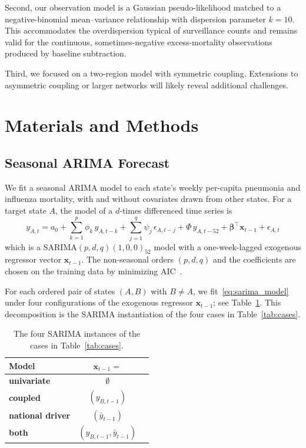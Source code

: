 \documentclass[11pt]{article}
\begin{document}
Second, our observation model is a Gaussian pseudo-likelihood matched
to a negative-binomial mean--variance relationship with dispersion
parameter $k = 10$. This accommodates the overdispersion typical of
surveillance counts and remains valid for the continuous,
sometimes-negative excess-mortality observations produced by baseline
subtraction.

Third, we focused on a two-region model with symmetric coupling.
Extensions to asymmetric coupling or larger networks will likely
reveal additional challenges.

\section{Materials and Methods}

\subsection{Seasonal ARIMA Forecast}\label{subsec:sarimabench}
We fit a seasonal ARIMA model to each state's weekly per-capita
pneumonia and influenza mortality, with and without covariates drawn
from other states. For a target state $A$, the model of a $d$-times
differenced time series is
\begin{equation}\label{eq:sarima_model}
  y_{A,t}  = a_0
    + \sum_{k=1}^{p} \phi_k\, y_{A, t-k}
    + \sum_{j=1}^{q} \psi_j\, \epsilon_{A, t-j}
    + \Phi\, y_{A, t-52}
    + \boldsymbol{\beta}^{\top} \mathbf{x}_{t-1}
    + \epsilon_{A,t}%
\end{equation}
which is a SARIMA$(p,d,q)(1,0,0)_{52}$ model with a one-week-lagged
exogenous regressor vector $\mathbf{x}_{t-1}$.
The non-seasonal orders $(p, d, q)$ and the coefficients are chosen on
the training data by minimizing AIC~\citep{hyndman2008}.

For each ordered pair of states $(A, B)$ with $B \neq A$, we
fit~\eqref{eq:sarima_model} under four configurations of the exogenous
regressor $\mathbf{x}_{t-1}$; see Table~\ref{tab:SARIMAs}. This
decomposition is the SARIMA instantiation of the four cases in
Table~\ref{tab:cases}.

\begin{table}[h]
\centering
\renewcommand{\arraystretch}{1.15}
\begin{tabular}{@{}l c  c@{}}
\toprule
Model & $\mathbf{x}_{t-1}=$ \\
\midrule
\textbf{univariate}                   & $\emptyset$     \\
\textbf{coupled}                        & $(y_{B, t-1})$   \\
\textbf{national driver}             & $(\bar y_{t-1})$ \\
\textbf{both}   & $(y_{B, t-1},\bar y_{t-1})$ \\
\bottomrule
\end{tabular}
\caption{The four SARIMA instances of the cases in
  Table~\ref{tab:cases}.}
\label{tab:SARIMAs}
\end{table}
\end{document}

